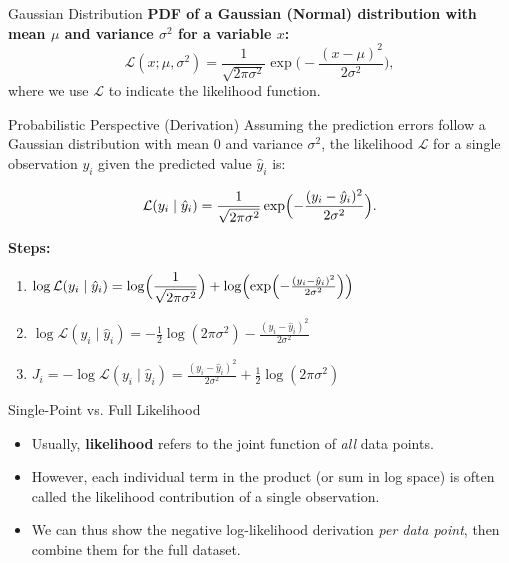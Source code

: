 \documentclass{beamer}
\begin{document}
\begin{frame}{Gaussian Distribution}
\textbf{PDF of a Gaussian (Normal) distribution with mean \(\mu\) and variance \(\sigma^2\) for a variable \(x\):}
\[
\mathcal{L}(x; \mu, \sigma^2) = \frac{1}{\sqrt{2\pi\sigma^2}} 
\exp\!\Biggl( -\frac{(x - \mu)^2}{2\sigma^2} \Biggr),
\]
where we use \(\mathcal{L}\) to indicate the likelihood function.
\end{frame}

\begin{frame}{Probabilistic Perspective (Derivation)}
Assuming the prediction errors follow a Gaussian distribution with mean 0 and variance \(\sigma^2\), 
the likelihood \(\mathcal{L}\) for a single observation \(y_i\) given the predicted value \(\hat{y}_i\) is:

\[
\mathcal{L}(y_i \mid \hat{y}_i) = 
\frac{1}{\sqrt{2\pi\sigma^2}} 
\exp\Bigl( -\frac{(y_i - \hat{y}_i)^2}{2\sigma^2} \Bigr).
\]

\textbf{Steps:}
\begin{enumerate}
\item \(\displaystyle 
\log \mathcal{L}(y_i \mid \hat{y}_i) = 
\log\Bigl(\frac{1}{\sqrt{2\pi\sigma^2}}\Bigr) + 
\log\Bigl(\exp\Bigl( -\tfrac{(y_i - \hat{y}_i)^2}{2\sigma^2}\Bigr)\Bigr)\)

\item \(\displaystyle 
\log \mathcal{L}(y_i \mid \hat{y}_i) = 
-\frac{1}{2}\log(2\pi\sigma^2) 
-\frac{(y_i - \hat{y}_i)^2}{2\sigma^2}\)

\item \(\displaystyle 
J_i = -\log \mathcal{L}(y_i \mid \hat{y}_i) = 
\frac{(y_i - \hat{y}_i)^2}{2\sigma^2} + 
\frac{1}{2}\log(2\pi\sigma^2)\)
\end{enumerate}
\end{frame}

\begin{frame}{Single-Point vs. Full Likelihood}
\begin{itemize}
  \item Usually, \textbf{likelihood} refers to the joint function of \emph{all} data points.
  \item However, each individual term in the product (or sum in log space) is often called the likelihood contribution of a single observation.
  \item We can thus show the negative log-likelihood derivation \emph{per data point}, then combine them for the full dataset.
\end{itemize}
\end{frame}
\end{document}
